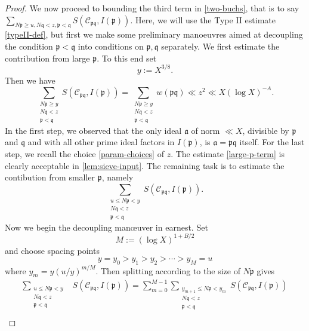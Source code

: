 \documentclass[11pt,reqno]{amsart}
\numberwithin{equation}{section}
\theoremstyle{definition}
\theoremstyle{remark}
\newcommand{\mc}{\mathcal}
\newcommand{\mf}{\mathfrak}
\renewcommand{\le}{\leqslant}
\renewcommand{\ge}{\geqslant}
\begin{document}
\begin{proof}
We now proceed to bounding the third term in \cref{two-buchs}, that is to say $\sum_{N\mf{p} \ge u ,  N\mf{q} < z ,\mf{p} < \mf{q}} S(\mc{C}_{\mf{p}\mf{q}},I(\mf{p}))$. Here, we will use the Type II estimate \cref{typeII-def}, but first we make some preliminary manoeuvres aimed at decoupling the condition $\mf{p} < \mf{q}$ into conditions on $\mf{p}, \mf{q}$ separately. We first estimate the contribution from large $\mf{p}$. To this end set
\begin{equation}\label{y-choice} y := X^{3/8}.\end{equation}
Then we have
\begin{equation}\label{large-p-term}\sum_{\substack{N\mf{p} \ge y \\ N\mf{q} < z \\ \mf{p} < \mf{q}}}S(\mc{C}_{\mf{p}\mf{q}},I(\mf{p})) = \sum_{\substack{N\mf{p} \ge y \\ N\mf{q} < z \\ \mf{p} < \mf{q}}}w(\mf{p}\mf{q})\ll z^2  \ll X(\log X)^{-A} .\end{equation}
In the first step, we observed that the only ideal $\mf{a}$ of norm $\ll X$, divisible by $\mf{p}$ and $\mf{q}$ and with all other prime ideal factors in $I(\mf{p})$, is $\mf{a} = \mf{p}\mf{q}$ itself. For the last step, we recall the choice \cref{param-choices} of $z$.  The estimate \cref{large-p-term} is clearly acceptable in \cref{lem:sieve-input}. The remaining task is to estimate the contibution from  smaller $\mf{p}$, namely
\begin{equation}\label{rem-to-est}\sum_{\substack{u \le N\mf{p} < y \\ N\mf{q} < z \\ \mf{p} < \mf{q}}}S(\mc{C}_{\mf{p}\mf{q}},I(\mf{p})).\end{equation}
Now we begin the decoupling man{\oe}uver in earnest. Set 
\begin{equation}\label{m-choice} M := (\log X)^{1 + B/2} \end{equation} and choose spacing points
\[ y = y_0 >y_1>y_2>\cdots >y_M = u\] where $y_m = y(u/y)^{m/M}$. Then splitting according to the size of $N\mf{p}$ gives
\begin{align*}
\sum_{\substack{u \le N\mf{p} < y \\ N\mf{q} < z \\ \mf{p} < \mf{q}}}&S(\mc{C}_{\mf{p}\mf{q}},I(\mf{p})) =\sum_{m=0}^{M-1} \sum_{\substack{y_{m+1} \le N\mf{p} < y_m \\ N\mf{q} < z \\ \mf{p} < \mf{q}}}S(\mc{C}_{\mf{p}\mf{q}},I(\mf{p}))\\

\end{align*}
\end{proof}
\end{document}
